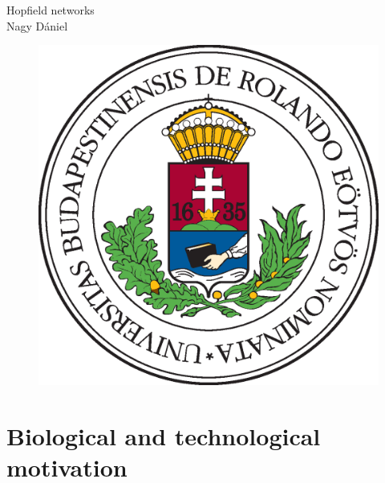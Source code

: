 \documentclass[12pt]{article}
\numberwithin{equation}{section}
\begin{document}
\begin{center}
    \thispagestyle{empty}
    \vspace{3.0cm}
    {\LARGE Hopfield networks}
    \vspace{1.0cm}\\
    {\large Nagy Dániel}
    \vspace{1.5cm}
    \begin{figure}[h!]
        \centering
        \includegraphics[scale=0.3]{images/elte.eps}
    \end{figure}
    \vspace{0.5cm}
\end{center}
\newpage

\newpage
\section*{Biological and technological motivation}
\end{document}
